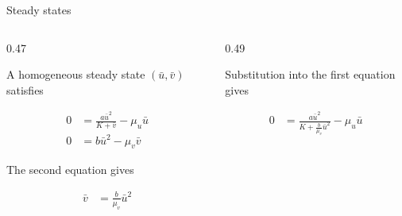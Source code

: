 \begin{frame}{Steady states}

  \vspace{-0.18cm}

  \begin{columns}[c,onlytextwidth]

    \begin{column}{0.47\textwidth}

      {\color{HydraMuted}\fontsize{7.8}{9.6}\selectfont
        A homogeneous steady state $(\bar u,\bar v)$ satisfies
      \par}

      \vspace{-0.18cm}

      {\color{HydraWhite}\fontsize{9.7}{12.3}\selectfont
      \begin{align*}
        0
        &=
        \frac{a\bar u^2}{K+\bar v}-\mu_u\bar u
        \\
        0
        &=
        b\bar u^2-\mu_v\bar v
      \end{align*}
      }

      \vspace{-0.34cm}

      {\color{HydraMuted}\fontsize{7.8}{9.6}\selectfont
        The second equation gives
      \par}

      \vspace{-0.24cm}

      {\color{HydraWhite}\bfseries\fontsize{11}{13.8}\selectfont
      \begin{align*}
        \bar v
        &=
        \frac{b}{\mu_v}\bar u^2
      \end{align*}
      }

    \end{column}

    \begin{column}{0.49\textwidth}

      {\color{HydraMuted}\fontsize{7.8}{9.6}\selectfont
        Substitution into the first equation gives
      \par}

      \vspace{-0.18cm}

      {\color{HydraWhite}\fontsize{9.2}{11.7}\selectfont
      \begin{align*}
        0
        &=
        \frac{a\bar u^2}
        {K+\frac{b}{\mu_v}\bar u^2}
        -
        \mu_u\bar u
      \end{align*}
      }


\end{column}
\end{columns}
\end{frame}
